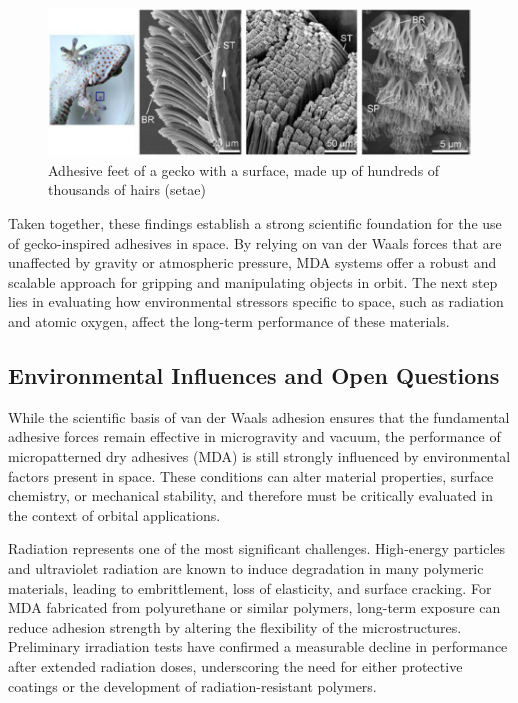 \documentclass[
    twocolumn,
    fontsize = 10pt,
    parskip = half+,
    headings = small,
    headwidth = text,
    footwidth = text,
]{scrartcl}
\begin{document}
\begin{figure}[h!]
    \centering
    \includegraphics[width=0.7\linewidth]{pics/gecko.png}
    \caption{Adhesive feet of a gecko with a surface, made up of hundreds of thousands of hairs (setae)}
    \label{fig:gecko}
\end{figure}

Taken together, these findings establish a strong scientific foundation for the use of gecko-inspired adhesives in space. 
By relying on van der Waals forces that are unaffected by gravity or atmospheric pressure, 
MDA systems offer a robust and scalable approach for gripping and manipulating objects in orbit. 
The next step lies in evaluating how environmental stressors specific to space, such as radiation and atomic oxygen, 
affect the long-term performance of these materials.


\subsection{Environmental Influences and Open Questions}

While the scientific basis of van der Waals adhesion ensures that the fundamental adhesive forces remain 
effective in microgravity and vacuum, the performance of micropatterned dry adhesives (MDA) 
is still strongly influenced by environmental factors present in space. 
These conditions can alter material properties, surface chemistry, or mechanical stability, 
and therefore must be critically evaluated in the context of orbital applications.  

Radiation represents one of the most significant challenges. 
High-energy particles and ultraviolet radiation are known to induce degradation in many polymeric materials, 
leading to embrittlement, loss of elasticity, and surface cracking. 
For MDA fabricated from polyurethane or similar polymers, 
long-term exposure can reduce adhesion strength by altering the flexibility of the microstructures. 
Preliminary irradiation tests have confirmed a measurable decline in performance after extended radiation doses, 
underscoring the need for either protective coatings or the development of radiation-resistant polymers.  
\end{document}
